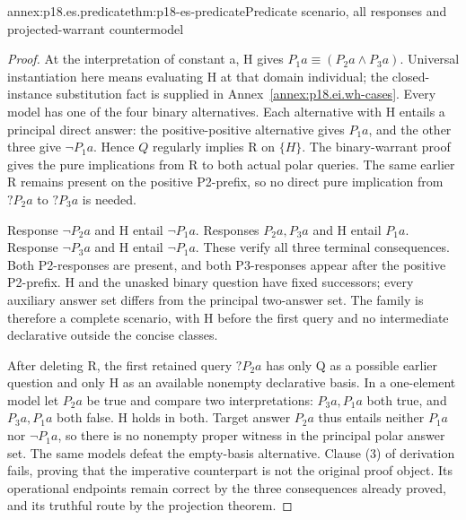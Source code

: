 \begin{annexitem}{annex:p18.es.predicate}{thm:p18-es-predicate}{Predicate scenario, all responses and projected-warrant countermodel}
\begin{proof}
At the interpretation of constant a, H gives
\(P_1a\equiv(P_2a\land P_3a)\). Universal instantiation here
means evaluating H at that domain individual; the closed-instance
substitution fact is supplied in Annex~\ref{annex:p18.ei.wh-cases}.
Every model has one of the four binary alternatives. Each alternative with
H entails a principal direct answer: the positive-positive alternative gives
\(P_1a\), and the other three give \(\neg P_1a\). Hence \(Q\) regularly
implies R on \(\{H\}\). The binary-warrant proof gives the pure implications
from R to both actual polar queries. The same earlier R remains present on
the positive P2-prefix, so no direct pure implication from \(?P_2a\) to
\(?P_3a\) is needed.

Response \(\neg P_2a\) and H entail \(\neg P_1a\). Responses
\(P_2a,P_3a\) and H entail \(P_1a\). Response \(\neg P_3a\) and H
entail \(\neg P_1a\). These verify all three terminal consequences.
Both P2-responses are present, and both P3-responses appear after the positive
P2-prefix. H and the unasked binary question have fixed successors; every
auxiliary answer set differs from the principal two-answer set. The family
is therefore a complete scenario, with H before the first query and no
intermediate declarative outside the concise classes.

After deleting R, the first retained query \(?P_2a\) has only Q as a possible
earlier question and only H as an available nonempty declarative basis. In a
one-element model let \(P_2a\) be true and compare two interpretations:
\(P_3a,P_1a\) both true, and \(P_3a,P_1a\) both false. H holds in both.
Target answer \(P_2a\) thus entails neither \(P_1a\) nor \(\neg P_1a\),
so there is no nonempty proper witness in the principal polar answer set.
The same models defeat the empty-basis alternative. Clause (3) of derivation
fails, proving that the imperative counterpart is not the original proof
object. Its operational endpoints remain correct by the three consequences
already proved, and its truthful route by the projection theorem.
\end{proof}
\end{annexitem}

